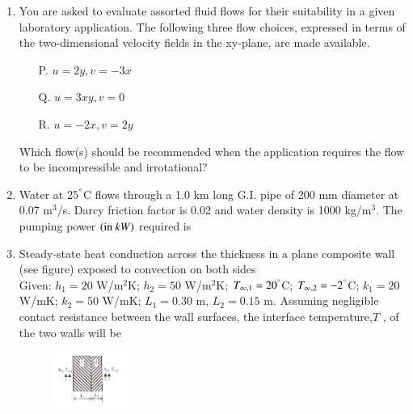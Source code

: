 \documentclass[journal]{IEEEtran}
\begin{document}
\begin{enumerate}[leftmargin=0pt]
\item You are asked to evaluate assorted fluid flows for their suitability in a given laboratory application.
The following three flow choices, expressed in terms of the two-dimensional velocity fields in the
xy-plane, are made available.\\
\begin{enumerate}
 \item[P.] $u =2y, v =-3x$
 \item[Q.] $u =3xy, v = 0$
 \item[R.] $u=-2x, v=2y$
\end{enumerate}


Which flow(s) should be recommended when the application requires the flow to be incompressible and
irrotational?

\begin{enumerate}
\hfill{}
\end{enumerate}

\item Water at 25$^\degree$C flows through a 1.0 km long G.I. pipe of 200 mm diameter at $0.07$ m$^3$/s. Darcy friction factor is 0.02 and water density is 1000 kg/m$^3$. The pumping power $\brak{\text{in} \ kW}$ required is
\begin{enumerate}
\hfill{}
\end{enumerate}

\item Steady-state heat conduction across the thickness in a plane composite wall (see figure) exposed to convection on both sides\\Given: $h_1 = 20$ W/m$^2$K; $h_2 = 50$ W/m$^2$K; $T_{\infty,1}=20^\degree$C; $T_{\infty,2}=-2^\degree$C; $k_1 = 20$ W/mK; $k_2 = 50$ W/mK; $L_1 = 0.30$ m, $L_2 = 0.15$ m. Assuming negligible contact resistance between the wall surfaces, the interface temperature,$T$ , of the two walls will be 
\begin{figure}[h]
  \centering
  \includegraphics[width=0.23\textwidth]{Figs/image (5).png}
  \caption{}
  \label{fig:33}
\end{figure}



\end{enumerate}
\end{document}
